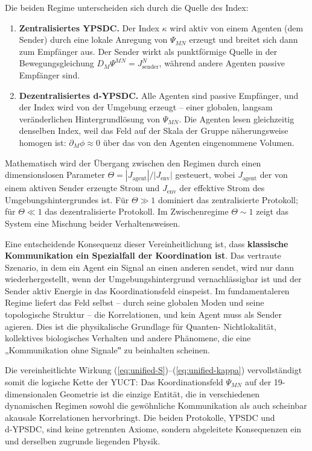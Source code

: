 \documentclass[12pt,a4paper]{article}
\begin{document}
	Die beiden Regime unterscheiden sich durch die Quelle des Index:
	
	\begin{enumerate}[leftmargin=*, label=\textbf{(\arabic*)}]
		\item \textbf{Zentralisiertes YPSDC.} Der Index \(\kappa\) wird aktiv von
		einem Agenten (dem Sender) durch eine lokale Anregung von \(\Psi_{MN}\) erzeugt und
		breitet sich dann zum Empfänger aus. Der Sender wirkt als punktförmige Quelle in der
		Bewegungsgleichung \(D_M\Psi^{MN} = J^{N}_{\mathrm{sender}}\), während andere
		Agenten passive Empfänger sind.
		\item \textbf{Dezentralisiertes d‑YPSDC.} Alle Agenten sind passive Empfänger, und
		der Index wird von der Umgebung erzeugt – einer globalen, langsam veränderlichen
		Hintergrundlösung von \(\Psi_{MN}\). Die Agenten lesen gleichzeitig denselben
		Index, weil das Feld auf der Skala der Gruppe näherungsweise homogen ist: \(\partial_M\phi \approx 0\) über das von den Agenten eingenommene Volumen.
	\end{enumerate}
	
	Mathematisch wird der Übergang zwischen den Regimen durch einen dimensionslosen
	Parameter \(\Theta = |J_{\mathrm{agent}}| / |J_{\mathrm{env}}|\) gesteuert, wobei
	\(J_{\mathrm{agent}}\) der von einem aktiven Sender erzeugte Strom und
	\(J_{\mathrm{env}}\) der effektive Strom des Umgebungshintergrundes ist.
	Für \(\Theta \gg 1\) dominiert das zentralisierte Protokoll; für \(\Theta \ll 1\) das
	dezentralisierte Protokoll. Im Zwischenregime
	\(\Theta \sim 1\) zeigt das System eine Mischung beider Verhaltensweisen.
	
	Eine entscheidende Konsequenz dieser Vereinheitlichung ist, dass \textbf{klassische
		Kommunikation ein Spezialfall der Koordination ist}. Das vertraute Szenario, in dem
	ein Agent ein Signal an einen anderen sendet, wird nur dann wiederhergestellt, wenn der Umgebungshintergrund
	vernachlässigbar ist und der Sender aktiv Energie in das
	Koordinationsfeld einspeist. Im fundamentaleren Regime liefert das Feld selbst – durch
	seine globalen Moden und seine topologische Struktur – die Korrelationen, und kein
	Agent muss als Sender agieren. Dies ist die physikalische Grundlage für Quanten-
	Nichtlokalität, kollektives biologisches Verhalten und andere Phänomene, die eine
	„Kommunikation ohne Signale‟ zu beinhalten scheinen.
	
	Die vereinheitlichte Wirkung (\ref{eq:unified-S})–(\ref{eq:unified-kappa}) vervollständigt
	somit die logische Kette der YUCT: Das Koordinationsfeld \(\Psi_{MN}\) auf der
	19-dimensionalen Geometrie ist die einzige Entität, die in verschiedenen dynamischen
	Regimen sowohl die gewöhnliche Kommunikation als auch scheinbar akausale
	Korrelationen hervorbringt. Die beiden Protokolle, YPSDC und d‑YPSDC, sind keine getrennten Axiome,
	sondern abgeleitete Konsequenzen ein und derselben zugrunde liegenden Physik.
	
\end{document}
